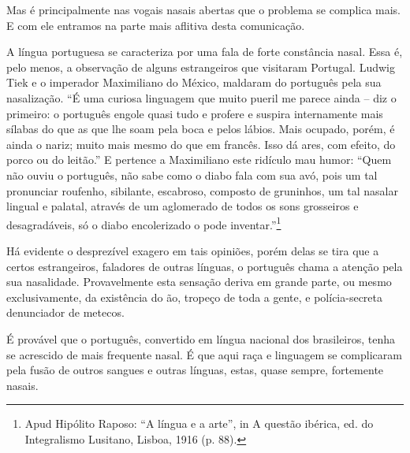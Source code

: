 Mas é principalmente nas vogais nasais abertas que o problema se
complica mais. E com ele entramos na parte mais aflitiva desta
comunicação.

A língua portuguesa se caracteriza por uma fala de forte constância
nasal. Essa é, pelo menos, a observação de alguns estrangeiros que
visitaram Portugal. Ludwig Tiek e o imperador Maximiliano do México,
maldaram do português pela sua nasalização. ``É uma curiosa linguagem
que muito pueril me parece ainda -- diz o primeiro: o português engole
quasi tudo e profere e suspira internamente mais sílabas do que as que
lhe soam pela boca e pelos lábios. Mais ocupado, porém, é ainda o nariz;
muito mais mesmo do que em francês. Isso dá ares, com efeito, do porco
ou do leitão.'' E pertence a Maximiliano este ridículo mau humor: ``Quem
não ouviu o português, não sabe como o diabo fala com sua avó, pois um
tal pronunciar roufenho, sibilante, escabroso, composto de gruninhos, um
tal nasalar lingual e palatal, através de um aglomerado de todos os sons
grosseiros e desagradáveis, só o diabo encolerizado o pode inventar.''\footnote{Apud Hipólito Raposo: ``A língua e a arte'', in A questão ibérica,
ed. do Integralismo Lusitano, Lisboa, 1916 (p. 88).}

Há evidente o desprezível exagero em tais opiniões, porém delas se tira
que a certos estrangeiros, faladores de outras línguas, o português
chama a atenção pela sua nasalidade. Provavelmente esta sensação deriva
em grande parte, ou mesmo exclusivamente, da existência do ão, tropeço
de toda a gente, e polícia-secreta denunciador de metecos.

É provável que o português, convertido em língua nacional dos
brasileiros, tenha se acrescido de mais frequente nasal. É que aqui raça
e linguagem se complicaram pela fusão de outros sangues e outras
línguas, estas, quase sempre, fortemente nasais.

